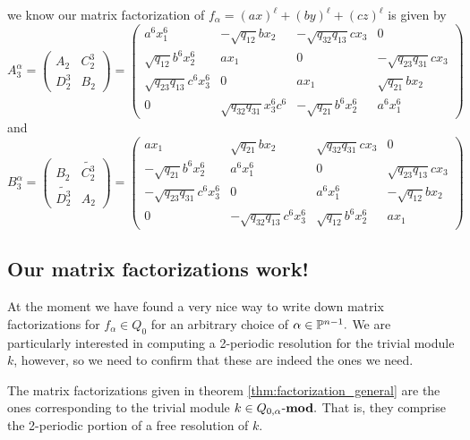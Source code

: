 \documentclass [11pt, proquest] {uwthesis}[2020/02/24]
\begin{document}
    we know our matrix factorization of $f_\alpha=(ax)^\ell+(by)^\ell+(cz)^\ell$ is given by
    \[A_3^\alpha=\begin{pmatrix}
        A_{2} & C_{2}^3\\D_{2}^3& B_{2}
    \end{pmatrix}=\begin{pmatrix}
        a^6x_1^6 & -\sqrt{q_{12}}bx_2 & -\sqrt{q_{32}q_{13}}cx_3 & 0\\ 
        \sqrt{q_{12}}b^6x_2^6 & ax_1 & 0 & -\sqrt{q_{23}q_{31}}cx_3\\
        \sqrt{q_{23}q_{13}}c^6x_3^6 & 0 & ax_1 & \sqrt{q_{21}}bx_2\\ 
        0 & \sqrt{q_{32}q_{31}}x_3^6c^6 &-\sqrt{q_{21}}b^6x_2^6 & a^6x_1^6
    \end{pmatrix}\]
    and
    \[B_3^\alpha=\begin{pmatrix}
        B_{2}&\widetilde{C_{2}^3}\\ \widetilde{D_{2}^3} & A_{2}
    \end{pmatrix}=\begin{pmatrix}
        ax_1 & \sqrt{q_{21}}bx_2 & \sqrt{q_{32}q_{31}}cx_3 & 0\\ 
        -\sqrt{q_{21}}b^6x_2^6 & a^6x_1^6 & 0 & \sqrt{q_{23}q_{13}}cx_3\\
        -\sqrt{q_{23}q_{31}}c^6x_3^6 & 0 & a^6x_1^6 & -\sqrt{q_{12}}bx_2\\ 
        0 & -\sqrt{q_{32}q_{13}}c^6x_3^6 & \sqrt{q_{12}}b^6x_2^6 & ax_1
    \end{pmatrix}\]
    
\subsection{Our matrix factorizations work!}
    At the moment we have found a very nice way to write down matrix factorizations for $f_\alpha\in Q_0$ for an arbitrary choice of $\alpha\in\mathbb{P}^{n-1}.$ We are particularly interested in computing a 2-periodic resolution for the trivial module $k$, however, so we need to confirm that these are indeed the ones we need.
    
    \begin{conj}
        The matrix factorizations given in theorem \ref{thm:factorization_general} are the ones corresponding to the trivial module $k\in Q_{0,\alpha}\text{-}\mathbf{mod}.$ That is, they comprise the 2-periodic portion of a free resolution of $k$.
    \end{conj}
    
\end{document}
